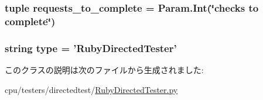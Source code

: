 \hypertarget{classRubyDirectedTester_1_1RubyDirectedTester_a78128ad1f6c5983bd9089fa4090c7114}{
\subsubsection[{requests\_\-to\_\-complete}]{\setlength{\rightskip}{0pt plus 5cm}tuple {\bf requests\_\-to\_\-complete} = Param.Int(\char`\"{}checks to complete\char`\"{})}}
\label{classRubyDirectedTester_1_1RubyDirectedTester_a78128ad1f6c5983bd9089fa4090c7114}
\hypertarget{classRubyDirectedTester_1_1RubyDirectedTester_acce15679d830831b0bbe8ebc2a60b2ca}{
\subsubsection[{type}]{\setlength{\rightskip}{0pt plus 5cm}string {\bf type} = '{\bf RubyDirectedTester}'}}
\label{classRubyDirectedTester_1_1RubyDirectedTester_acce15679d830831b0bbe8ebc2a60b2ca}


このクラスの説明は次のファイルから生成されました:\begin{DoxyCompactItemize}
\item 
cpu/testers/directedtest/\hyperlink{RubyDirectedTester_8py}{RubyDirectedTester.py}\end{DoxyCompactItemize}
